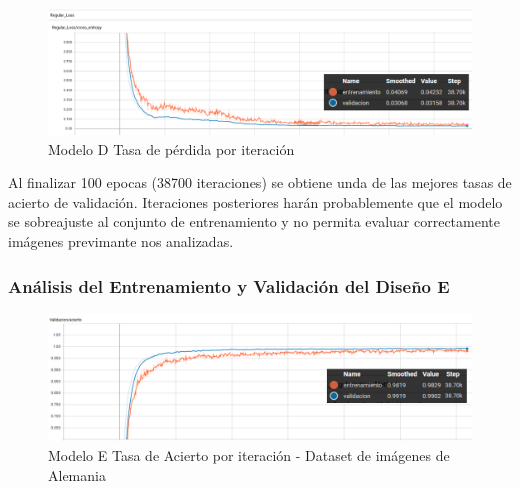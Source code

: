 			\begin{figure}[H]
				\begin{center}
				\includegraphics[width=1\textwidth]{images/desarrollo/trainResults/model6Loss} 
				\end{center}
				\begin{center}
				\caption{\small{Modelo D Tasa de pérdida por iteración}}
				\vspace{-1em}
				{\small{\fontsize{10}{16.8}\selectfont {Fuente propia}}}
				\end{center}
				\vspace{-1.5em}
			\end{figure}

			Al finalizar 100 epocas (38700 iteraciones) se obtiene unda de las mejores tasas de acierto de validación. Iteraciones posteriores harán probablemente que el modelo se sobreajuste al conjunto de entrenamiento y no permita evaluar correctamente imágenes previmante nos analizadas.
			

		\subsubsection{Análisis del Entrenamiento y Validación del Diseño E} 
			\begin{figure}[H]
				\begin{center}
				\includegraphics[width=1\textwidth]{images/desarrollo/trainResults/model7Acierto} 
				\end{center}
				\begin{center}
				\caption{\small{Modelo E Tasa de Acierto por iteración - Dataset de imágenes de Alemania  }}
				\vspace{-1em}
				{\small{\fontsize{10}{16.8}\selectfont {Fuente propia}}}
				\end{center}
				\vspace{-1.5em}
			\end{figure}
		
